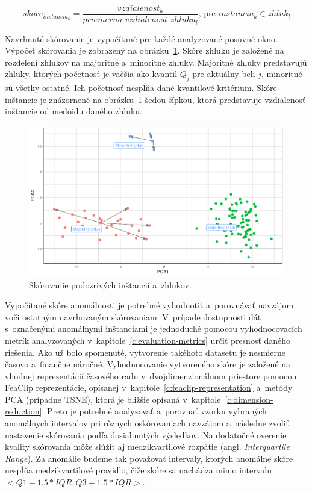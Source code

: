 \documentclass[a4paper,twoside,slovak,12pt,appendix]{article}
\begin{document}
\begin{equation}
  skore_{instancia_k} = \frac{vzdialenost_k}{priemerna\_vzdialenost\_zhluku_l} \text{, pre } instancia_k \in zhluk_l
  \label{eq:instance-score}
\end{equation}

Navrhnuté skórovanie je vypočítané pre každé analyzované posuvné okno. Výpočet
skórovania je zobrazený na obrázku~\ref{fig:clustering-score}. Skóre zhluku je
založené na rozdelení zhlukov na majoritné a~minoritné zhluky. Majoritné zhluky
predstavujú zhluky, ktorých početnosť je väčšia ako kvantil $Q_j$ pre aktuálny
beh $j$, minoritné sú všetky ostatné. Ich početnosť nespĺňa dané kvantilové
kritérium. Skóre inštancie je znázornené na obrázku~\ref{fig:clustering-score}
šedou šípkou, ktorá predstavuje vzdialenosť inštancie od medoidu daného zhluku.

\begin{figure}
  \centering
  \includegraphics[width=\textwidth]{clustering_score.png}
  \caption{Skórovanie podozrivých inštancií a~zhlukov.}
  \label{fig:clustering-score}
\end{figure}

Vypočítané skóre anomálnosti je potrebné vyhodnotiť a~porovnávať navzájom voči
ostatným navrhovaným skórovaniam. V~prípade dostupnosti dát s~označenými
anomálnymi inštanciami je jednoduché pomocou vyhodnocovacích metrík
analyzovaných v~kapitole~\ref{c:evaluation-metrics} určiť presnosť daného
riešenia. Ako už bolo spomenuté, vytvorenie takéhoto datasetu je nesmierne
časovo a~finančne náročné. Vyhodnocovanie vytvoreného skóre je založené na
vhodnej reprezentácií časového radu v~dvojdimenzionálnom priestore pomocou
FeaClip reprezentácie, opísanej v~kapitole~\ref{c:feaclip-representation}
a~metódy PCA (prípadne TSNE), ktorá je bližšie opísaná
v~kapitole~\ref{c:dimension-reduction}. Preto je potrebné analyzovať a~porovnať
vzorku vybraných anomálnych intervalov pri rôznych oskórovaniach navzájom
a~následne zvoliť nastavenie skórovania podľa dosiahnutých výsledkov. Na
dodatočné overenie kvality skórovania môže slúžiť aj medzikvartilové rozpätie
(angl. \textit{Interquartile Range}). Za anomálie budeme tak považovať
intervaly, ktorých anomálne skóre nespĺňa medzikvartilové pravidlo, čiže skóre
sa nachádza mimo intervalu $<Q1 - 1.5 * IQR, Q3 + 1.5 * IQR>$.
\end{document}
